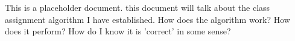 This is a placeholder document. this document will talk about the class assignment algorithm I have established.
How does the algorithm work?
How does it perform?
How do I know it is 'correct' in some sense?
